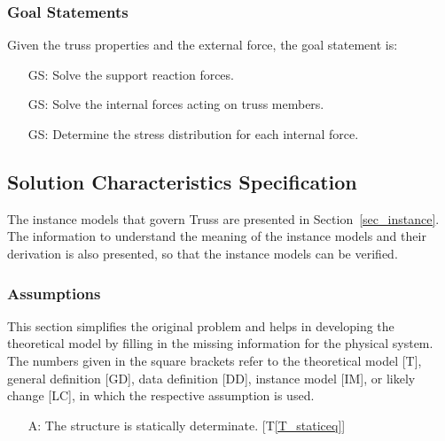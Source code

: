 \documentclass[12pt]{article}
\newcommand{\tref}[1]{T\ref{#1}}
\newcounter{assumpnum} %
\newcounter{goalnum} %
\begin{document}
\subsubsection{Goal Statements}\label{sec_goal}

\noindent 
Given the truss properties and the external force, the goal statement is:

\begin{itemize}
\item[GS\refstepcounter{goalnum}\thegoalnum \label{G_solreactforce}:] 
{Solve the support reaction forces.}

\item[GS\refstepcounter{goalnum}\thegoalnum \label{G_solforce}:] 
{Solve the internal forces acting on truss members.}
\item[GS\refstepcounter{goalnum}\thegoalnum \label{G_stressdist}:] 
{Determine the stress distribution for each internal force.}
\end{itemize}

\subsection{Solution Characteristics Specification} \label{Sec_solcharspec}

The instance models that govern Truss are presented in 
Section~\ref{sec_instance}.  The information to understand the meaning of the
instance models and their derivation is also presented, so that the instance
models can be verified.

\subsubsection{Assumptions} \label{sec_assumpt}

This section simplifies the original problem and helps in developing the
theoretical model by filling in the missing information for the physical
system. The numbers given in the square brackets refer to the theoretical model
[T], general definition [GD], data definition [DD], instance model [IM], or
likely change [LC], in which the respective assumption is used.

\begin{itemize}
	
\item[A\refstepcounter{assumpnum}\theassumpnum \label{A_static}:]
 The structure is statically determinate. [\tref{T_staticeq}]
 
\end{itemize}
\end{document}
